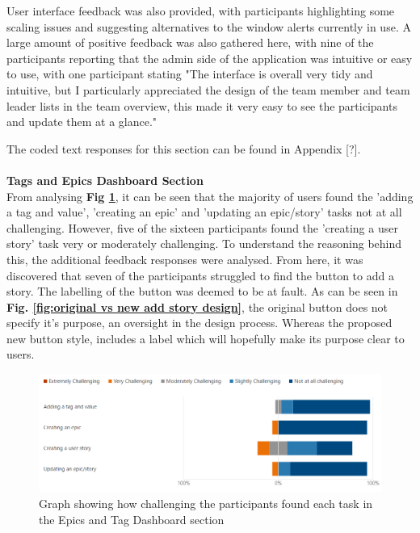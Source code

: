 \documentclass[l4proj.tex]{subfiles}
\begin{document}
User interface feedback was also provided, with participants highlighting some scaling issues and suggesting alternatives to the window alerts currently in use. A large amount of positive feedback was also gathered here, with nine of the participants reporting that the admin side of the application was intuitive or easy to use, with one participant stating "The interface is overall very tidy and intuitive, but I particularly appreciated the design of the team member and team leader lists in the team overview, this made it very easy to see the participants and update them at a glance." 

The coded text responses for this section can be found in Appendix [?]. \\
\\
\textbf{Tags and Epics Dashboard Section}\\
From analysing \textbf{Fig \ref{fig:epic and tag form feedback}}, it can be seen that the majority of users found the 'adding a tag and value', 'creating an epic' and 'updating an epic/story' tasks not at all challenging. However, five of the sixteen participants found the 'creating a user story' task very or moderately challenging. To understand the reasoning behind this, the additional feedback responses were analysed. From here, it was discovered that seven of the participants struggled to find the button to add a story. The labelling of the button was deemed to be at fault. As can be seen in \textbf{Fig. \ref{fig:original vs new add story design}}, the original button does not specify it's purpose, an oversight in the design process. Whereas the proposed new button style, includes a label which will hopefully make its purpose clear to users. 

\begin{figure}[h!]
\begin{center}
\includegraphics[scale=0.5]{dissertation/images/EvaluationEpicsAndTagsChallengingGraph.png}
\caption{Graph showing how challenging the participants found each task in the Epics and Tag Dashboard section}
\label{fig:epic and tag form feedback} 
\end{center}
\end{figure}
\end{document}
